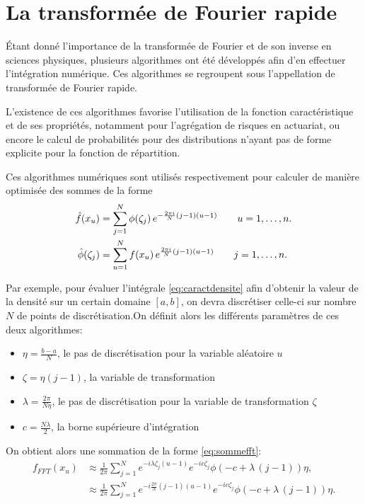 \section{La transformée de Fourier rapide}
\label{sec:methodeFFT}

Étant donné l'importance de la transformée de Fourier et de son
inverse en sciences physiques, plusieurs algorithmes ont été
développés afin d'en effectuer l'intégration numérique. Ces
algorithmes se regroupent sous l'appellation de transformée de Fourier
rapide.

L'existence de ces algorithmes favorise l'utilisation de la fonction
caractéristique et de ses propriétés, notamment pour l'agrégation de
risques en actuariat, ou encore le calcul de probabilités pour des
distributions n'ayant pas de forme explicite pour la fonction de
répartition.

Ces algorithmes numériques sont utilisés respectivement pour calculer
de manière optimisée des sommes de la forme
\begin{align}
  \hat{f}(x_u) &= \sum_{j=1}^{N} \phi(\zeta_j)\,e^{-{2\pi i \over N} (j-1)(u-1) } \qquad u = 1,\dots,n. \label{eq:sommefft} \\
  \hat{\phi}(\zeta_j) &= \sum_{u=1}^{N} f(x_u)\,e^{{2\pi i \over N}
    (j-1)(u-1) } \qquad j = 1,\dots,n. \label{eq:sommeifft}
\end{align}

Par exemple, pour évaluer l'intégrale \eqref{eq:caractdensite} afin
d'obtenir la valeur de la densité sur un certain domaine
$\left[a,b\right]$, on devra discrétiser celle-ci sur nombre $N$ de
points de discrétisation.On définit alors les différents paramètres de
ces deux algorithmes:
\begin{itemize}
\item $\eta = \frac{b-a}{N}$, le pas de discrétisation pour la
  variable aléatoire $u$
\item $\zeta = \eta(j-1)$, la variable de transformation
\item $\lambda = \frac{2\pi}{N\eta}$, le pas de discrétisation pour la
  variable de transformation $\zeta$
\item $c=\frac{N\lambda}{2}$, la borne supérieure d'intégration
\end{itemize}

On obtient alors une sommation de la forme \eqref{eq:sommefft}:
\begin{subequations}\label{eq:sommefftdensite}
  \begin{align}
    f_{FFT}(x_u) &\approx \frac{1}{2\pi} \sum_{j=1}^N e^{-i\lambda\zeta_j(u-1)} e^{-ic\zeta_j} \phi(-c+\lambda\,(j-1)) \eta, \label{eq:sommefftdensite1}\\
    &\approx \frac{1}{2\pi} \sum_{j=1}^N
    e^{-i\frac{2\pi}{N}(j-1)(u-1)} e^{-ic\zeta_j}
    \phi(-c+\lambda\,(j-1)) \eta.\label{eq:sommefftdensite2}
  \end{align}
\end{subequations}

